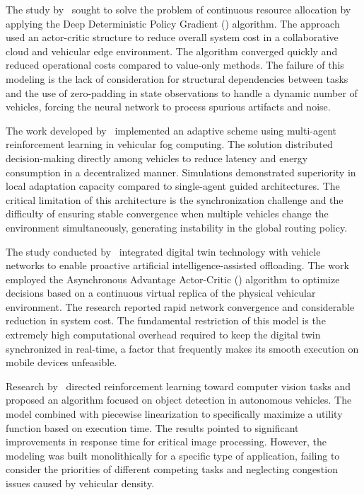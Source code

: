 The study by~\cite{shi2023} sought to solve the problem of continuous resource allocation by applying the Deep Deterministic Policy Gradient () algorithm. The approach used an actor-critic structure to reduce overall system cost in a collaborative cloud and vehicular edge environment. The algorithm converged quickly and reduced operational costs compared to value-only methods. The failure of this modeling is the lack of consideration for structural dependencies between tasks and the use of zero-padding in state observations to handle a dynamic number of vehicles, forcing the neural network to process spurious artifacts and noise.

The work developed by~\cite{gao2022} implemented an adaptive scheme using multi-agent reinforcement learning in vehicular fog computing. The solution distributed decision-making directly among vehicles to reduce latency and energy consumption in a decentralized manner. Simulations demonstrated superiority in local adaptation capacity compared to single-agent guided architectures. The critical limitation of this architecture is the synchronization challenge and the difficulty of ensuring stable convergence when multiple vehicles change the environment simultaneously, generating instability in the global routing policy.

The study conducted by~\cite{zheng2023} integrated digital twin technology with vehicle networks to enable proactive artificial intelligence-assisted offloading. The work employed the Asynchronous Advantage Actor-Critic () algorithm to optimize decisions based on a continuous virtual replica of the physical vehicular environment. The research reported rapid network convergence and considerable reduction in system cost. The fundamental restriction of this model is the extremely high computational overhead required to keep the digital twin synchronized in real-time, a factor that frequently makes its smooth execution on mobile devices unfeasible.

Research by~\cite{nie2023} directed reinforcement learning toward computer vision tasks and proposed an algorithm focused on object detection in autonomous vehicles. The model combined  with piecewise linearization to specifically maximize a utility function based on execution time. The results pointed to significant improvements in response time for critical image processing. However, the modeling was built monolithically for a specific type of application, failing to consider the priorities of different competing tasks and neglecting congestion issues caused by vehicular density.

